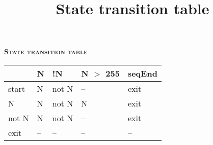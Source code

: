 \documentclass[12pt]{article}
\title {State transition table}
\begin{document}
	\begin{center}
		{\large \textbf{\textsc{State transition table}}}\\\vspace{12mm}

		\begin{tabular}{ | l | l | l | l | l |}
			\hline
    			& N & !N & N $>$ 255 & seqEnd 	\\  \hline
			start & N & not N & -- & exit 	\\ \hline
			N & N & not N & N & exit 	\\ \hline
			not N & N & not N & -- & exit 	\\ \hline
			exit  & -- & -- & -- & -- 	\\ \hline	
		\end{tabular}
	\end{center}
\end{document}
